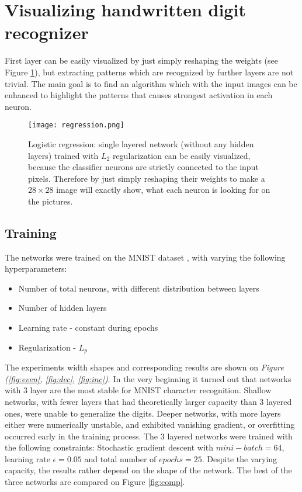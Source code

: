\clearpage
\section{Visualizing handwritten digit recognizer}
First layer can be easily visualized by just simply reshaping the weights (see Figure \ref{fig:regression}), but extracting patterns which are recognized by further layers are not trivial. The main goal is to find an algorithm which with the input images can be enhanced to highlight the patterns that causes strongest activation in each neuron.


\begin{figure}
    \centering
    \texttt{[image: regression.png]}
    \caption{Logistic regression: single layered network (without any hidden layers) trained with $L_2$ regularization can be easily visualized, because the classifier neurons are strictly connected to the input pixels. Therefore by just simply reshaping their weights to make a $28 \times 28$ image will exactly show, what each neuron is looking for on the pictures.}
    \label{fig:regression}
\end{figure}

\subsection{Training}
\label{train}
The networks were trained on the MNIST dataset \cite{mnist}, with varying the following hyperparameters:
\begin{itemize}
    \item Number of total neurons, with different distribution between layers
    \item Number of hidden layers
    \item Learning rate - constant during epochs
    \item Regularization - $L_p$
\end{itemize}

The experiments width shapes and corresponding results are shown on \emph{Figure (\ref{fig:even}, \ref{fig:dec}, \ref{fig:inc})}.
In the very beginning it turned out that networks with 3 layer are the most stable for MNIST character recognition. 
Shallow networks, with fewer layers that had theoretically larger capacity than 3 layered ones, were unable to generalize the digits.
Deeper networks, with more layers either were numerically unstable, and exhibited vanishing gradient, or overfitting occurred early in the training process.
The 3 layered networks were trained with the following constraints: Stochastic gradient descent with $mini-batch=64$, learning rate $\epsilon = 0.05$ and total number of $epochs=25$.
Despite the varying capacity, the results rather depend on the shape of the network. The best of the three networks are compared on Figure \ref{fig:comp}.


